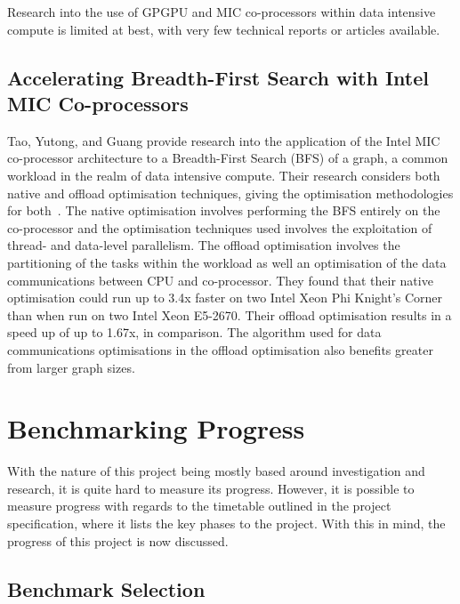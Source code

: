 \documentclass[12pt,a4paper]{article}
\begin{document}
        Research into the use of GPGPU and MIC co-processors within data intensive compute is limited at best, with very few technical reports or articles available.
        
        \subsection{Accelerating Breadth-First Search with Intel MIC Co-processors}
        \label{sub:accelerating_bfs_with_mic}
        
            Tao, Yutong, and Guang provide research into the application of the Intel MIC co-processor architecture to a Breadth-First Search (BFS) of a graph, a common workload in the realm of data intensive compute. Their research considers both native and offload optimisation techniques, giving the optimisation methodologies for both~\cite{mic-accelerate-bfs}. The native optimisation involves performing the BFS entirely on the co-processor and the optimisation techniques used involves the exploitation of thread- and data-level parallelism. The offload optimisation involves the partitioning of the tasks within the workload as well an optimisation of the data communications between CPU and co-processor. They found that their native optimisation could run up to 3.4x faster on two Intel Xeon Phi Knight's Corner than when run on two Intel Xeon E5-2670. Their offload optimisation results in a speed up of up to 1.67x, in comparison. The algorithm used for data communications optimisations in the offload optimisation also benefits greater from larger graph sizes.
    
    \section{Benchmarking Progress}
    \label{sec:benchmarking_progress}
    
        With the nature of this project being mostly based around investigation and research, it is quite hard to measure its progress. However, it is possible to measure progress with regards to the timetable outlined in the project specification, where it lists the key phases to the project. With this in mind, the progress of this project is now discussed.
    
        \subsection{Benchmark Selection}
        \label{sub:benchmark_selection}
        
\end{document}
